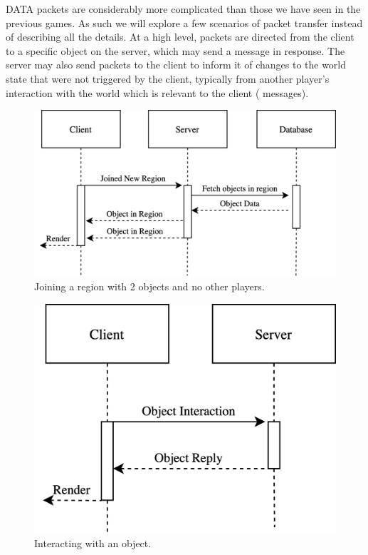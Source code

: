 DATA packets are considerably more complicated than those we have seen in the previous games. As such we will explore a few scenarios of packet transfer instead of describing all the details. At a high level, packets are directed from the client to a specific object on the server, which may send a message in response. The server may also send packets to the client to inform it of changes to the world state that were not triggered by the client, typically from another player's interaction with the world which is relevant to the client (\eg{} messages).

\begin{figure}[ht]
  \includegraphics[width=\columnwidth]{figures/join_region}
  \caption{Joining a region with 2 objects and no other players.}
  \Description[]{}
\end{figure}

\begin{figure}[h]
  \includegraphics[width=0.66\columnwidth]{figures/interact}
  \caption{Interacting with an object.}
  \Description[]{}
\end{figure}

